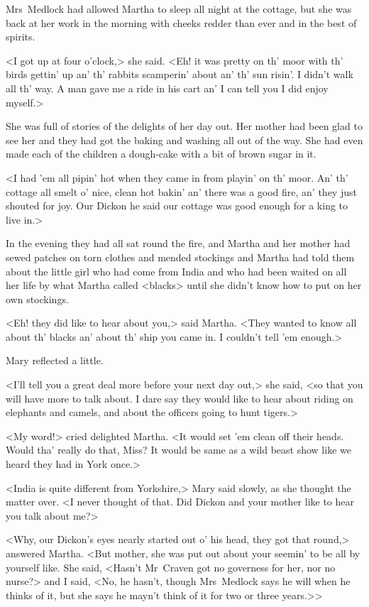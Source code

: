 Mrs~Medlock had allowed Martha to sleep all night at the cottage, but she was back at her work in the morning with cheeks redder than ever and in the best of spirits.

<I got up at four o'clock,> she said. <Eh! it was pretty on th' moor with th' birds gettin' up an' th' rabbits scamperin' about an' th' sun risin'. I didn't walk all th' way. A man gave me a ride in his cart an' I can tell you I did enjoy myself.>

She was full of stories of the delights of her day out. Her mother had been glad to see her and they had got the baking and washing all out of the way. She had even made each of the children a dough-cake with a bit of brown sugar in it.

<I had 'em all pipin' hot when they came in from playin' on th' moor. An' th' cottage all smelt o' nice, clean hot bakin' an' there was a good fire, an' they just shouted for joy. Our Dickon he said our cottage was good enough for a king to live in.>

In the evening they had all sat round the fire, and Martha and her mother had sewed patches on torn clothes and mended stockings and Martha had told them about the little girl who had come from India and who had been waited on all her life by what Martha called <blacks> until she didn't know how to put on her own stockings.

<Eh! they did like to hear about you,> said Martha. <They wanted to know all about th' blacks an' about th' ship you came in. I couldn't tell 'em enough.>

Mary reflected a little.

<I'll tell you a great deal more before your next day out,> she said, <so that you will have more to talk about. I dare say they would like to hear about riding on elephants and camels, and about the officers going to hunt tigers.>

<My word!> cried delighted Martha. <It would set 'em clean off their heads. Would tha' really do that, Miss? It would be same as a wild beast show like we heard they had in York once.>

<India is quite different from Yorkshire,> Mary said slowly, as she thought the matter over. <I never thought of that. Did Dickon and your mother like to hear you talk about me?>

<Why, our Dickon's eyes nearly started out o' his head, they got that round,> answered Martha. <But mother, she was put out about your seemin' to be all by yourself like. She said, <Hasn't Mr~Craven got no governess for her, nor no nurse?> and I said, <No, he hasn't, though Mrs~Medlock says he will when he thinks of it, but she says he mayn't think of it for two or three years.>>

